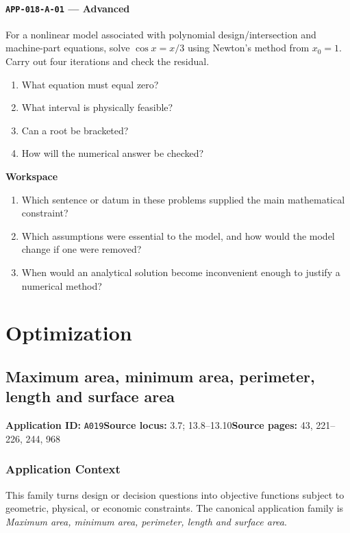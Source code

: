 \documentclass[11pt]{book}
\newcommand{\pid}[1]{\texttt{#1}}
\newcommand{\workspace}{\par\vspace{0.7in}\hrulefill\par\vspace{0.55in}\hrulefill\par}
\begin{document}
\subsection*{\pid{APP-018-A-01} — Advanced}
\begin{problembox}
For a nonlinear model associated with polynomial design/intersection and machine-part equations, solve $\cos x=x/3$ using Newton's method from $x_0=1$. Carry out four iterations and check the residual.
\end{problembox}
\begin{promptbox}\begin{enumerate}
\item What equation must equal zero?
\item What interval is physically feasible?
\item Can a root be bracketed?
\item How will the numerical answer be checked?
\end{enumerate}\end{promptbox}
\textbf{Workspace}\workspace
\begin{reflectionbox}\begin{enumerate}
\item Which sentence or datum in these problems supplied the main mathematical constraint?
\item Which assumptions were essential to the model, and how would the model change if one were removed?
\item When would an analytical solution become inconvenient enough to justify a numerical method?
\end{enumerate}\end{reflectionbox}
\part{Optimization}
\chapter{Maximum area, minimum area, perimeter, length and surface area}\label{app:A019}
\textbf{Application ID:} \pid{A019}\quad \textbf{Source locus:} 3.7; 13.8–13.10\quad \textbf{Source pages:} 43, 221–226, 244, 968
\section*{Application Context}
This family turns design or decision questions into objective functions subject to geometric, physical, or economic constraints. The canonical application family is \emph{Maximum area, minimum area, perimeter, length and surface area}.
\end{document}
